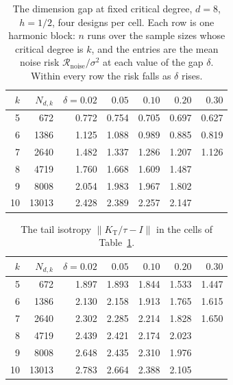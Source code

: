 \documentclass[11pt]{article}
\theoremstyle{definition}
\newcommand{\Kt}{K_{\mathrm{T}}}
\begin{document}
\begin{table}[t]
\centering
\caption{The dimension gap at fixed critical degree, $d=8$, $h=1/2$, four designs per cell. Each row
is one harmonic block: $n$ runs over the sample sizes whose critical degree is $k$, and the entries
are the mean noise risk $\mathcal R_{\mathrm{noise}}/\sigma^2$ at each value of the gap $\delta$.
Within every row the risk falls as $\delta$ rises.}
\label{tab:gap}
\begin{tabular}{rrrrrrr}
\toprule
$k$ & $N_{d,k}$ & $\delta=0.02$ & $0.05$ & $0.10$ & $0.20$ & $0.30$\\
\midrule
5 & 672 & 0.772 & 0.754 & 0.705 & 0.697 & 0.627\\
6 & 1386 & 1.125 & 1.088 & 0.989 & 0.885 & 0.819\\
7 & 2640 & 1.482 & 1.337 & 1.286 & 1.207 & 1.126\\
8 & 4719 & 1.760 & 1.668 & 1.609 & 1.487 & \\
9 & 8008 & 2.054 & 1.983 & 1.967 & 1.802 & \\
10 & 13013 & 2.428 & 2.389 & 2.257 & 2.147 & \\
\bottomrule
\end{tabular}
\end{table}

\begin{table}[t]
\centering
\caption{The tail isotropy $\|\Kt/\tau-I\|$ in the cells of Table~\ref{tab:gap}.}
\label{tab:gapiso}
\begin{tabular}{rrrrrrr}
\toprule
$k$ & $N_{d,k}$ & $\delta=0.02$ & $0.05$ & $0.10$ & $0.20$ & $0.30$\\
\midrule
5 & 672 & 1.897 & 1.893 & 1.844 & 1.533 & 1.447\\
6 & 1386 & 2.130 & 2.158 & 1.913 & 1.765 & 1.615\\
7 & 2640 & 2.302 & 2.285 & 2.214 & 1.828 & 1.650\\
8 & 4719 & 2.439 & 2.421 & 2.174 & 2.023 & \\
9 & 8008 & 2.648 & 2.435 & 2.310 & 1.976 & \\
10 & 13013 & 2.783 & 2.664 & 2.388 & 2.105 & \\
\bottomrule
\end{tabular}
\end{table}
\end{document}
